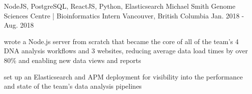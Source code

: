 \begin{cventries}
  \cventry
    {NodeJS, PostgreSQL, ReactJS, Python, Elasticsearch} %
    {Michael Smith Genome Sciences Centre | Bioinformatics Intern} %
    {Vancouver, British Columbia} %
    {Jan. 2018 - Aug. 2018} %
    {
      \begin{cvitems} %
        \item {wrote a Node.js server from scratch that became the core of all of the team’s 4 DNA analysis workflows and 3 websites, reducing average data load times by over 80\% and enabling new data views and reports}
        \item {set up an Elasticsearch and APM deployment for visibility into the performance and state of the team’s data analysis pipelines}
      \end{cvitems}
    }

\end{cventries}

